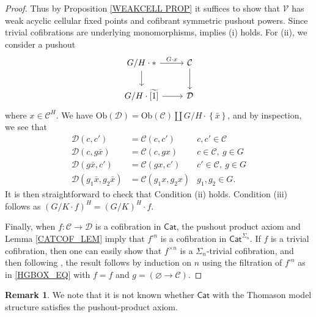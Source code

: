 \documentclass[a4paper,10pt
,draft
]{article}%
\numberwithin{equation}{section}
\numberwithin{figure}{section}
\theoremstyle{definition} %
\newtheorem{remark}[equation]{Remark}%
\newcommand{\set}[1]{\left\{#1\right\}}%
\newcommand{\Cat}{\mathsf{Cat}}
\newcommand{\V}{\ensuremath{\mathcal V}}
\newcommand{\1}{\ensuremath{\mathbbm 1}}%
\begin{document}
\begin{proof}
      Thus by Proposition \ref{WEAKCELL PROP} it suffices to show that $\V$ has weak acyclic cellular fixed points and cofibrant symmetric pushout powers.
      Since trivial cofibrations are underlying monomorphisms, \cite[Prop. 2.3]{BMOOPY15} implies (i) holds.
      For (ii), we consider a pushout
      \[
            \begin{tikzcd}
                  G/H \cdot \** \arrow[d] \arrow[r, "G \cdot x"]
                  &
                  \mathcal C \arrow[d]
                  \\
                  G/H \cdot \widetilde{[1]} \arrow[r]
                  &
                  \mathcal D                  
            \end{tikzcd}
      \]
      where $x \in \mathcal C^H$.
      We have
      $\mathrm{Ob}(\mathcal D) = \mathrm{Ob}(\mathcal C) \amalg G/H \cdot \set{\bar x}$,
      and by inspection, we see that
      \begin{align*}
        \mathcal D(c,c') & = \mathcal C(c,c') & c,c' \in \mathcal C
        \\
        \mathcal D(c, g\bar x) & = \mathcal C(c, gx) & c \in \mathcal C,\ g \in G
        \\
        \mathcal D(g \bar x, c') & = \mathcal C(g x,c') & c' \in \mathcal C,\ g \in G
        \\
        \mathcal D(g_1 \bar x, g_2 \bar x) & = \mathcal C(g_1 x, g_2 x) & g_1,g_2 \in G.
      \end{align*} 
      It is then straightforward to check that Condition (ii) holds.
      Condition (iii) follows as $(G/K \cdot f)^H = (G/K)^H \cdot f$.

      Finally, when $f \colon \mathcal C \to \mathcal D$ is a cofibration in $\Cat$, the pushout product axiom and Lemma \ref{CATCOF_LEM} imply that $f^{\square n}$ is a cofibration in $\Cat^{\Sigma_n}$.
      If $f$ is a trivial cofibration, then one can easily show that $f^{\times n}$ is a $\Sigma_n$-trivial cofibration,
      and then following \cite[Remark 6.18]{BP_geo},
      the result follows by induction on $n$
      using the filtration of $f^{\square n}$ as in \eqref{HGBOX_EQ} with $f = f$ and $g = (\varnothing \to \mathcal C)$.
\end{proof}

\begin{remark}
      We note that it is not known whether $\Cat$ with the Thomason model structure satisfies the pushout-product axiom.
\end{remark}
\end{document}
